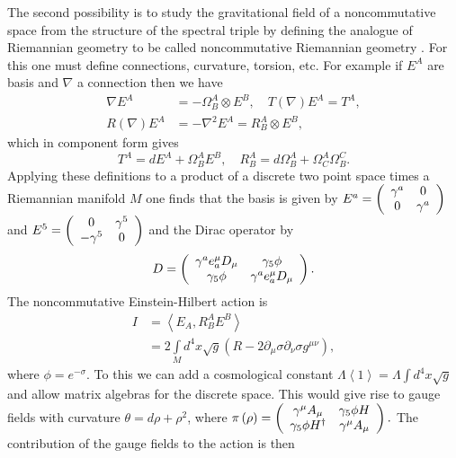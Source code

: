 \documentclass[a4paper,12pt]{article}
\begin{document}
The second possibility is to  study the gravitational field of a
noncommutative space from the structure of the spectral triple by defining the
analogue of Riemannian geometry to be called noncommutative Riemannian
geometry \cite{CFF}. For this one must define connections, curvature, torsion,
etc. For example if $E^{A}$ are basis and $\nabla$ a connection then we have
\begin{align*}
\nabla E^{A} &  =-\Omega_{B}^{A}\otimes E^{B},\quad T(\nabla)E^{A}=T^{A},\\
R(\nabla)E^{A} &  =-\nabla^{2}E^{A}=R_{B}^{A}\otimes E^{B},
\end{align*}
which in component form gives
\[
T^{A}=dE^{A}+\Omega_{B}^{A}E^{B},\quad R_{B}^{A}=d\Omega_{B}^{A}+\Omega
_{C}^{A}\Omega_{B}^{C}.
\]
Applying these definitions to a product of a discrete two point space times a
Riemannian manifold $M$ one finds that the basis is given by $E^{a}=\left(
\begin{array}
[c]{cc}%
\gamma^{a} & 0\\
0 & \gamma^{a}%
\end{array}
\right)  $ and $E^{5}=\left(
\begin{array}
[c]{cc}%
0 & \gamma^{5}\\
-\gamma^{5} & 0
\end{array}
\right)  $ and the Dirac operator by
\[
D=\left(
\begin{array}
[c]{cc}%
\gamma^{a}e_{a}^{\mu}D_{\mu} & \gamma_{5}\phi\\
\gamma_{5}\phi & \gamma^{a}e_{a}^{\mu}D_{\mu}%
\end{array}
\right)  .
\]
The noncommutative Einstein-Hilbert action is
\begin{align*}
I &  =\left\langle E_{A},R_{B}^{A}E^{B}\right\rangle \\
&  =2\int\limits_{M}d^{4}x\sqrt{g}\left(  R-2\partial_{\mu}\sigma\partial
_{\nu}\sigma g^{\mu\nu}\right)  ,
\end{align*}
where $\phi=e^{-\sigma}.$ To this we can add a cosmological constant
$\Lambda\left\langle 1\right\rangle =\Lambda\int d^{4}x\sqrt{g}$ and allow
matrix algebras for the discrete space. This would give rise to gauge fields
with curvature $\theta=d\rho+\rho^{2}$, where $\pi\left(  \rho\right)
=\left(
\begin{array}
[c]{cc}%
\gamma^{\mu}A_{\mu} & \gamma_{5}\phi H\\
\gamma_{5}\phi H^{\dagger} & \gamma^{\mu}A_{\mu}%
\end{array}
\right)  .$ The contribution of the gauge fields to the action is then
\end{document}
